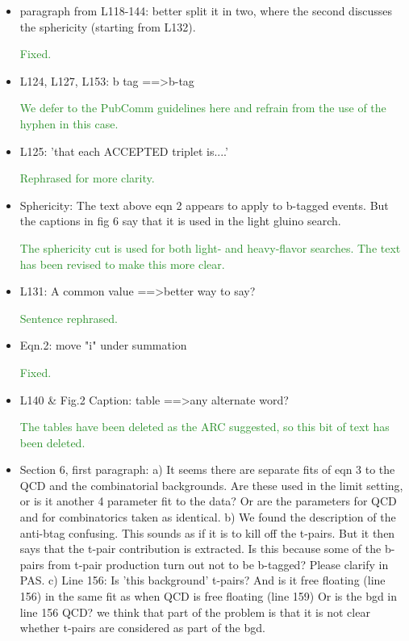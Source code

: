 \documentclass[paper=a4, fontsize=11pt]{scrartcl}
\begin{document}
\begin{itemize}
\item paragraph from L118-144: 
better split it in two, where the second discusses the sphericity (starting 
from L132). 

\textcolor{ForestGreen}{Fixed.}\\

\item L124, L127, L153: 
b tag ==\textgreater b-tag 

\textcolor{ForestGreen}{We defer to the PubComm guidelines here and refrain from the use of the hyphen
in this case.}\\


\item L125: 'that each ACCEPTED triplet is....' 

\textcolor{ForestGreen}{Rephrased for more clarity.}\\

\item Sphericity: 
The text above eqn 2 appears to apply to b-tagged events. But the captions 
in fig 6 say that it is used in the light gluino search. 

\textcolor{ForestGreen}{The sphericity cut is used for both light- and heavy-flavor searches.
The text has been revised to make this more clear.}\\

\item L131: 
A common value ==\textgreater better way to say? 

\textcolor{ForestGreen}{Sentence rephrased.}\\

\item Eqn.2: 
move "i" under summation 

\textcolor{ForestGreen}{Fixed.}\\

\item L140 \& Fig.2 Caption: 
table ==\textgreater any alternate word? 

\textcolor{ForestGreen}{The tables have been deleted as the ARC suggested, so this bit
of text has been deleted.}\\

\item Section 6, first paragraph: 
a) It seems there are separate fits of eqn 3 to the QCD and the combinatorial 
backgrounds. Are these used in the limit setting, or is it another 4 
parameter fit to the data? Or are the parameters for QCD and for 
combinatorics taken as identical. 
b) We found the description of the anti-btag confusing. This sounds as if it 
is to kill off the t-pairs. But it then says that the t-pair contribution is 
extracted. Is this because some of the b-pairs from t-pair production turn 
out not to be b-tagged? Please clarify in PAS. 
c) Line 156: Is 'this background' t-pairs? And is it free floating (line 156) 
in the same fit as when QCD is free floating (line 159) {Or is the bgd in 
line 156 QCD?} 
{we think that part of the problem is that it is not clear whether t-pairs 
are considered as part of the bgd.} 


\end{itemize}
\end{document}
